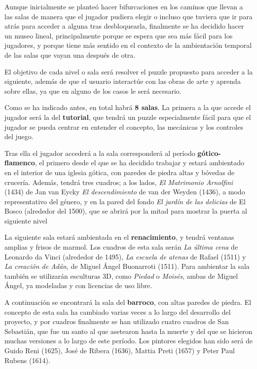 Aunque inicialmente se planteó hacer bifurcaciones en los caminos que llevan a las salas de manera que el jugador pudiera elegir o incluso que tuviera que ir para atrás para acceder a alguna tras desbloquearla, finalmente se ha decidido hacer un museo lineal, principalmente porque se espera que sea más fácil para los jugadores, y porque tiene más sentido en el contexto de la ambientación temporal de las salas que vayan una después de otra.

El objetivo de cada nivel o sala será resolver el puzzle propuesto para acceder a la siguiente, además de que el usuario interactúe con las obras de arte y aprenda sobre ellas, ya que en alguno de los casos le será necesario.

Como se ha indicado antes, en total habrá \textbf{8 salas}. La primera a la que accede el jugador será la del \textbf{tutorial}, que tendrá un puzzle especialmente fácil para que el jugador se pueda centrar en entender el concepto, las mecánicas y los controles del juego.

Tras ella el jugador accederá a la sala corresponderá al período \textbf{gótico-flamenco}, el primero desde el que se ha decidido trabajar y estará ambientado en el interior de una iglesia gótica, con paredes de piedra altas y bóvedas de crucería. Además, tendrá tres cuadros; a los lados, \textit{El Matrimonio Arnolfini} (1434)  de Jan van Eycky \textit{El descendimiento} de van der Weyden (1436), a modo representativo del género, y en la pared del fondo \textit{El jardín de las delicias} de El Bosco (alrededor del 1500), que se abrirá por la mitad para mostrar la puerta al siguiente nivel

La siguiente sala estará ambientada en el \textbf{renacimiento}, y tendrá ventanas amplias y frisos de marmol. Los cuadros de esta sala serán \textit{La última cena} de Leonardo da Vinci (alrededor de 1495), \textit{La escuela de atenas} de Rafael (1511) y \textit{La creación de Adán}, de Miguel Ángel Buonarroti (1511). Para ambientar la sala también se utilizarán esculturas 3D, como \textit{Piedad} o \textit{Moisés}, ambas de Miguel Ángel, ya modeladas y con licencias de uso libre.

A continuación se encontrará la sala del \textbf{barroco}, con altas paredes de piedra. El concepto de esta sala ha cambiado varias veces a lo largo del desarrollo del proyecto, y por cuadros finalmente se han utilizado cuatro cuadros de San Sebastián, que fue un santo al que asetearon hasta la muerte y del que se hicieron muchas versiones a lo largo de este período. Los pintores elegidos han sido será de Guido Reni (1625),  José de Ribera (1636), Mattia Preti (1657) y Peter Paul Rubens (1614).

